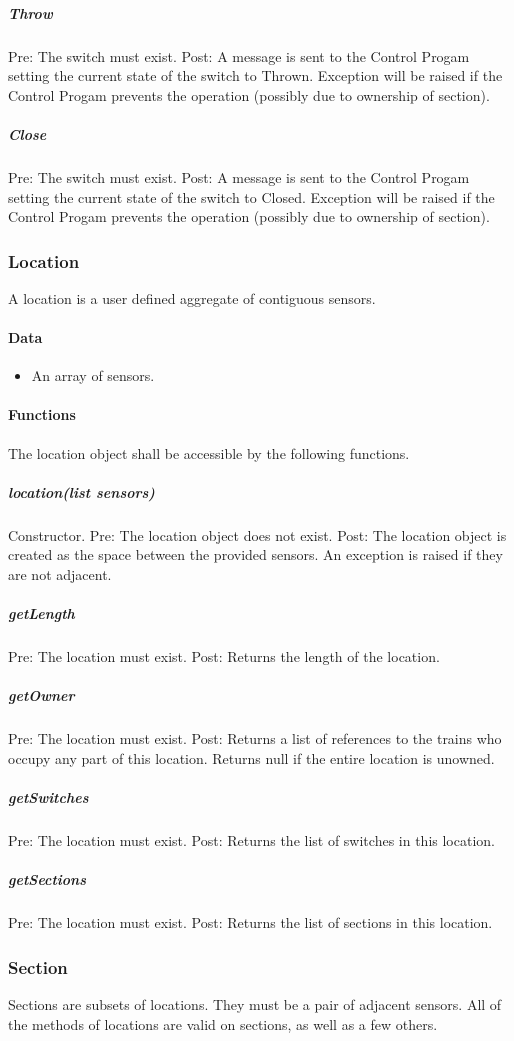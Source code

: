 \documentclass[a4paper,11pt,notitlepage]{article}
\def\CS{Control Progam\xspace}
\begin{document}
\subparagraph{Throw} Pre: The switch must exist.  Post:  A message is sent to the \CS setting the current state of the switch to Thrown. Exception will be raised if the \CS prevents the operation (possibly due to ownership of section).
\subparagraph{Close} Pre: The switch must exist.  Post:  A message is sent to the \CS setting the current state of the switch to Closed. Exception will be raised if the \CS prevents the operation (possibly due to ownership of section).

\subsubsection{Location}
A location is a user defined aggregate of contiguous sensors.
\paragraph{Data}
\begin{itemize}
\item An array of sensors.
\end{itemize}
\paragraph{Functions}
The location object shall be accessible by the following functions.
\subparagraph{location(list sensors)} Constructor. Pre: The location object does not exist. Post: The location object is created as the space between the provided sensors. An exception is raised if they are not adjacent.
\subparagraph{getLength} Pre: The location must exist. Post: Returns the length of the location.
\subparagraph{getOwner} Pre: The location must exist. Post: Returns a list of references to the trains who occupy any part of this location. Returns null if the entire location is unowned.
\subparagraph{getSwitches} Pre: The location must exist.  Post: Returns the list of switches in this location.
\subparagraph{getSections} Pre: The location must exist.  Post: Returns the list of sections in this location.

\subsubsection{Section}
Sections are subsets of locations. They must be a pair of adjacent sensors. All of the methods of locations are valid on sections, as well as a few others.
\end{document}
